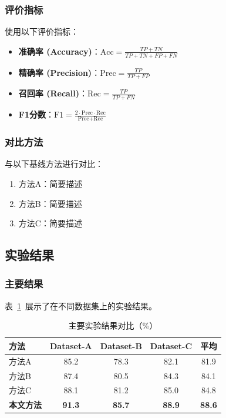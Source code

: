 \documentclass[12pt,a4paper]{article}
\begin{document}
\subsubsection{评价指标}

使用以下评价指标：

\begin{itemize}
    \item \textbf{准确率 (Accuracy)}：$\text{Acc} = \frac{TP + TN}{TP + TN + FP + FN}$
    \item \textbf{精确率 (Precision)}：$\text{Prec} = \frac{TP}{TP + FP}$
    \item \textbf{召回率 (Recall)}：$\text{Rec} = \frac{TP}{TP + FN}$
    \item \textbf{F1分数}：$\text{F1} = \frac{2 \cdot \text{Prec} \cdot \text{Rec}}{\text{Prec} + \text{Rec}}$
\end{itemize}

\subsubsection{对比方法}

与以下基线方法进行对比：
\begin{enumerate}
    \item 方法A：简要描述
    \item 方法B：简要描述
    \item 方法C：简要描述
\end{enumerate}

\subsection{实验结果}

\subsubsection{主要结果}

表~\ref{tab:main-results}~展示了在不同数据集上的实验结果。

\begin{table}[htbp]
    \centering
    \caption{主要实验结果对比（\%）}
    \label{tab:main-results}
    \begin{tabular}{lcccc}
        \toprule
        \textbf{方法} & \textbf{Dataset-A} & \textbf{Dataset-B} & \textbf{Dataset-C} & \textbf{平均} \\
        \midrule
        方法A & 85.2 & 78.3 & 82.1 & 81.9 \\
        方法B & 87.4 & 80.5 & 84.3 & 84.1 \\
        方法C & 88.1 & 81.2 & 85.0 & 84.8 \\
        \textbf{本文方法} & \textbf{91.3} & \textbf{85.7} & \textbf{88.9} & \textbf{88.6} \\
        \bottomrule
    \end{tabular}
\end{table}
\end{document}

